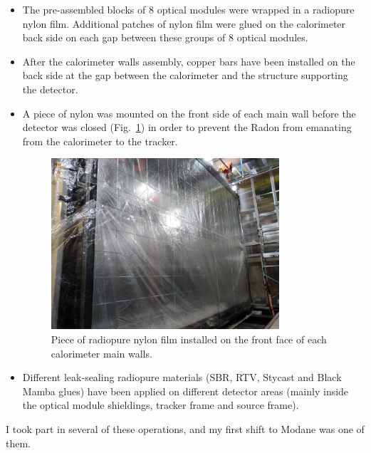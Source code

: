 \begin{itemize}
\item The pre-assembled blocks of $8$ optical modules were wrapped in a radiopure nylon film.
  Additional patches of nylon film were glued on the calorimeter back side on each gap between these groups of $8$ optical modules.
\item After the calorimeter walls assembly, copper bars have been installed on the back side at the gap between the calorimeter and the structure supporting the detector.
\item A piece of nylon was mounted on the front side of each main wall before the detector was closed (Fig.~\ref{fig:nylon_film}) in order to prevent the Radon from emanating from the calorimeter to the tracker.
\begin{figure}[h!]
\centering
\includegraphics[width=0.8\textwidth]{SNdemonstrator/fig_SNdemonstrator/Nylon_film.jpg}
\caption{Piece of radiopure nylon film installed on the front face of each calorimeter main walls.
\label{fig:nylon_film}}
\end{figure}
\item Different leak-sealing radiopure materials (SBR, RTV, Stycast and Black Mamba glues) have been applied on different detector areas (mainly inside the optical module shieldings, tracker frame and source frame).
\end{itemize}
I took part in several of these operations, and my first shift to Modane was one of them.

